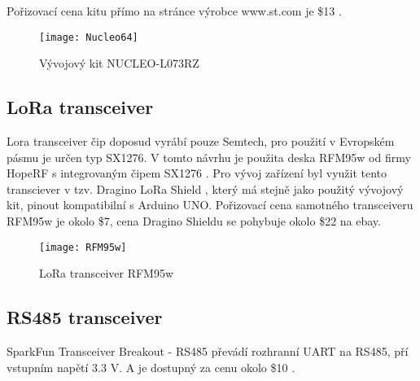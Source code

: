 Pořizovací cena kitu přímo na stránce výrobce www.st.com je \$13 \cite{nucleoST} \cite{nucleoMbed}.
\begin{figure}[!h]
    \centering
    \texttt{[image: Nucleo64]}
    \caption{Vývojový kit NUCLEO-L073RZ \cite{nucleoST}}
    \label{fig:02}
\end{figure}

\subsection{LoRa transceiver}
Lora transceiver čip doposud vyrábí pouze Semtech, pro použití v Evropském pásmu je určen typ SX1276.
V tomto návrhu je použita deska RFM95w od firmy HopeRF s integrovaným čipem SX1276 \cite{RFM95w}.
Pro vývoj zařízení byl využit tento transciever v tzv. Dragino LoRa Shield \cite{draginoWiki}, který má stejně jako použitý vývojový kit, pinout kompatibilní s Arduino UNO. Pořizovací cena samotného transceiveru RFM95w je okolo \$7, cena Dragino Shieldu se pohybuje okolo \$22 na ebay.

\begin{figure}[!h]
    \centering
    \texttt{[image: RFM95w]}
    \caption{LoRa transceiver RFM95w \cite{RFM95w}}
    \label{fig:02}
\end{figure}

\subsection{RS485 transceiver}
SparkFun Transceiver Breakout - RS485 převádí rozhranní UART na RS485, pří vstupním napětí 3.3 V. A je dostupný za cenu okolo \$10 \cite{rs485tr}.

